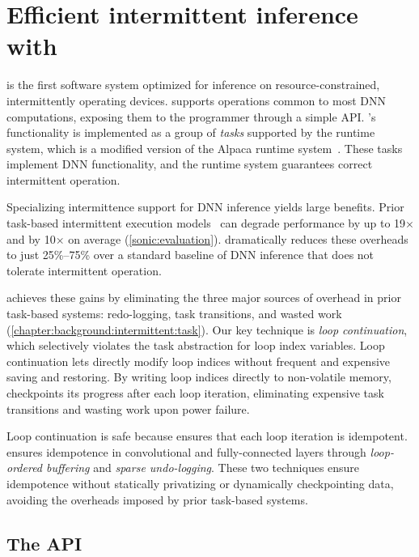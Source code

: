 \section{Efficient intermittent inference with \sonic}
\label{sonic:sonic}

\sonic is the first software system optimized for inference on
resource-constrained, intermittently operating devices.
%
\sonic supports operations common to most DNN computations,
exposing them to the programmer through a simple API.
%
\sonic's functionality is implemented as a group of {\em tasks}
supported by the \sonic runtime system, which is a modified version of the
Alpaca runtime system~\cite{alpaca}.
%
These tasks implement DNN functionality, and the \sonic runtime system 
guarantees correct intermittent operation.

Specializing intermittence support for DNN inference yields large benefits.
Prior task-based intermittent execution models~\cite{alpaca,chain} can degrade performance by up to 19$\times$
and by 10$\times$ on average
(\autoref{sonic:evaluation}).
\sonic dramatically reduces these overheads to just 25\%--75\% over
a standard baseline of DNN inference that does not tolerate intermittent operation.

\sonic achieves these gains by eliminating the three major sources of overhead in prior task-based systems:
redo-logging, task transitions, and wasted work (\autoref{chapter:background:intermittent:task}).
%
Our key technique is \emph{loop continuation},
which selectively violates the task abstraction
for loop index variables.
Loop continuation lets \sonic directly modify loop indices without frequent and expensive saving and restoring.
By writing loop indices directly to non-volatile memory,
\sonic checkpoints its progress after each loop iteration,
eliminating expensive task transitions
and wasting work upon power failure.

Loop continuation is safe because \sonic
ensures that each loop iteration is idempotent.
\sonic ensures idempotence 
in convolutional and fully-connected layers
through \emph{loop-ordered buffering} and \emph{sparse undo-logging}.
These two techniques ensure idempotence without statically privatizing or dynamically checkpointing data,
avoiding the overheads imposed by prior task-based systems.

\subsection{The \sonic API}

